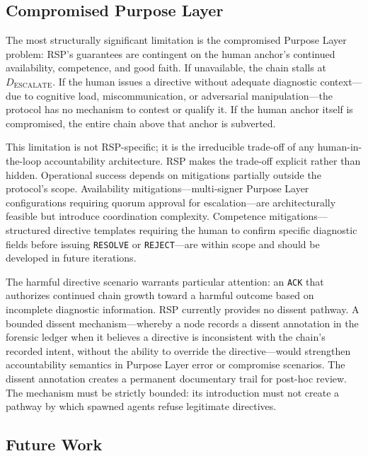 \subsection{Compromised Purpose Layer}
\label{sec:rs-purpose-compromise}

The most structurally significant limitation is the compromised Purpose Layer problem: RSP's guarantees are contingent on the human anchor's continued availability, competence, and good faith. If unavailable, the chain stalls at $D_{\text{ESCALATE}}$. If the human issues a directive without adequate diagnostic context—due to cognitive load, miscommunication, or adversarial manipulation—the protocol has no mechanism to contest or qualify it. If the human anchor itself is compromised, the entire chain above that anchor is subverted.

This limitation is not RSP-specific; it is the irreducible trade-off of any human-in-the-loop accountability architecture. RSP makes the trade-off explicit rather than hidden. Operational success depends on mitigations partially outside the protocol's scope. Availability mitigations—multi-signer Purpose Layer configurations requiring quorum approval for escalation—are architecturally feasible but introduce coordination complexity. Competence mitigations—structured directive templates requiring the human to confirm specific diagnostic fields before issuing \texttt{RESOLVE} or \texttt{REJECT}—are within scope and should be developed in future iterations.

The harmful directive scenario warrants particular attention: an \texttt{ACK} that authorizes continued chain growth toward a harmful outcome based on incomplete diagnostic information. RSP currently provides no dissent pathway. A bounded dissent mechanism—whereby a node records a dissent annotation in the forensic ledger when it believes a directive is inconsistent with the chain's recorded intent, without the ability to override the directive—would strengthen accountability semantics in Purpose Layer error or compromise scenarios. The dissent annotation creates a permanent documentary trail for post-hoc review. The mechanism must be strictly bounded: its introduction must not create a pathway by which spawned agents refuse legitimate directives.

\subsection{Future Work}
\label{sec:rs-future-work}

